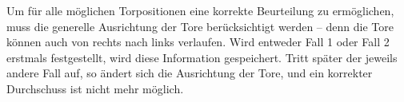 Um für alle möglichen Torpositionen eine korrekte Beurteilung zu ermöglichen, muss die generelle Ausrichtung der Tore berücksichtigt werden – denn die Tore können auch von rechts nach links verlaufen. Wird entweder Fall 1 oder Fall 2 erstmals festgestellt, wird diese Information gespeichert. Tritt später der jeweils andere Fall auf, so ändert sich die Ausrichtung der Tore, und ein korrekter Durchschuss ist nicht mehr möglich.
